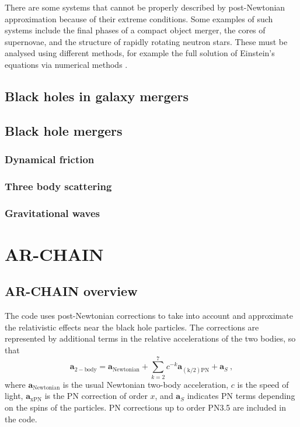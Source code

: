 \documentclass[english, oneside]{HYgradu}
\begin{document}
There are some systems that cannot be properly described by post-Newtonian approximation because of their extreme conditions. Some examples of such systems include the final phases of a compact object merger, the cores of supernovae, and the structure of rapidly rotating neutron stars. These must be analysed using different methods, for example the full solution of Einstein's equations via numerical methods \citep{will:2006}. 

\section{Black holes in galaxy mergers}

\section{Black hole mergers}
\subsection{Dynamical friction}
\subsection{Three body scattering}
\subsection{Gravitational waves}

\chapter{AR-CHAIN} \label{chap:ar-chain}
\section{AR-CHAIN overview}

The code uses post-Newtonian corrections to take into account and approximate the relativistic effects near the black hole particles. The corrections are represented by additional terms in the relative accelerations of the two bodies, so that
\begin{equation}
\boldsymbol{a}_\mathrm{2-body} = \boldsymbol{a}_\mathrm{Newtonian} + \sum_{k=2}^7 c^{-k} \boldsymbol{a}_\mathrm{(k/2)PN} + \boldsymbol{a}_S \ ,
\end{equation}
where $\boldsymbol{a}_\mathrm{Newtonian}$ is the usual Newtonian two-body acceleration, $c$ is the speed of light, $\boldsymbol{a}_\mathrm{xPN}$ is the PN correction of order $x$, and $\boldsymbol{a}_S$ indicates PN terms depending on the spins of the particles. PN corrections up to order PN3.5 are included in the code.
\end{document}
